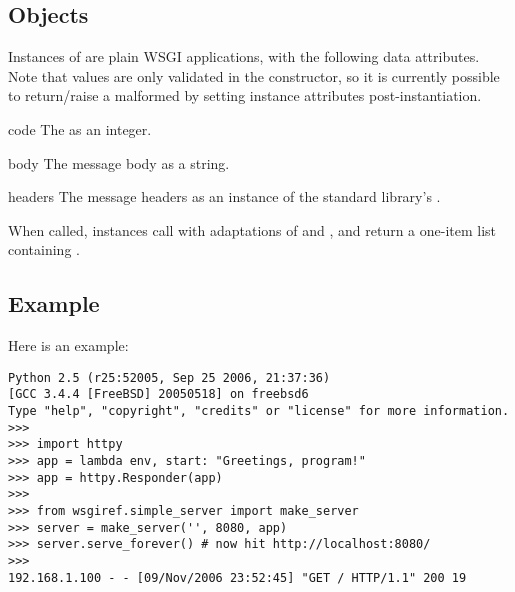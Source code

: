 \subsection{ Objects}

Instances of  are plain WSGI applications, with the
following data attributes. Note that values are only validated in the
constructor, so it is currently possible to return/raise a malformed
 by setting instance attributes post-instantiation.

\begin{datadesc}{code}
The  as an integer.
\end{datadesc}

\begin{datadesc}{body}
The message body as a string.
\end{datadesc}

\begin{datadesc}{headers}
The message headers as an instance of the standard library's
.
\end{datadesc}

When called,  instances call  with
adaptations of  and , and return a one-item list
containing .


\subsection{Example}

Here is an example:

\begin{verbatim}
Python 2.5 (r25:52005, Sep 25 2006, 21:37:36)
[GCC 3.4.4 [FreeBSD] 20050518] on freebsd6
Type "help", "copyright", "credits" or "license" for more information.
>>>
>>> import httpy
>>> app = lambda env, start: "Greetings, program!"
>>> app = httpy.Responder(app)
>>>
>>> from wsgiref.simple_server import make_server
>>> server = make_server('', 8080, app)
>>> server.serve_forever() # now hit http://localhost:8080/
>>>
192.168.1.100 - - [09/Nov/2006 23:52:45] "GET / HTTP/1.1" 200 19
\end{verbatim}